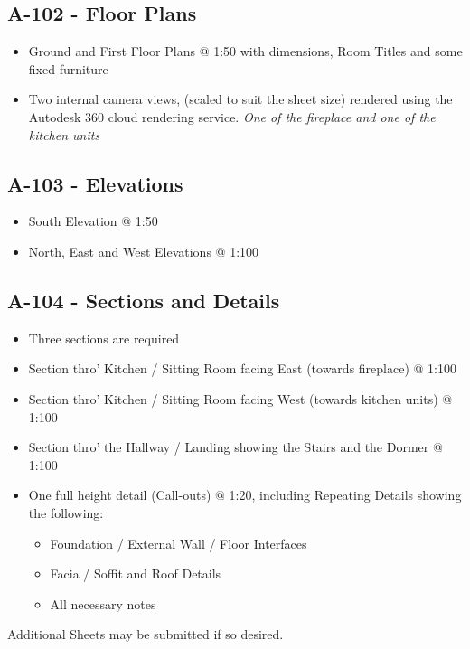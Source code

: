 \subsection*{A-102 - Floor Plans}
\begin{itemize}
	\item Ground and First Floor Plans @ 1:50 with dimensions, Room Titles and some fixed furniture
	\item Two internal camera views, (scaled to suit the sheet size) rendered using the Autodesk 360 cloud rendering service.  \textit{One of the fireplace and one of the kitchen units} 
\end{itemize}


\subsection*{A-103 - Elevations}
\begin{itemize}
	\item South Elevation @ 1:50
	\item North, East and West Elevations @ 1:100
\end{itemize}

\subsection*{A-104 - Sections and Details}
\begin{itemize}
	\item Three sections are required
	\item Section thro' Kitchen / Sitting Room facing East (towards fireplace) @ 1:100
	\item Section thro' Kitchen / Sitting Room facing West (towards kitchen units) @ 1:100
	\item Section thro' the Hallway / Landing showing the Stairs and the Dormer @ 1:100
	\item One full height detail (Call-outs) @ 1:20, including Repeating Details showing the following:
	\begin{itemize}
		\item Foundation / External Wall / Floor Interfaces
		\item Facia / Soffit and Roof Details
		\item All necessary notes
	\end{itemize} 
\end{itemize}

Additional Sheets may be submitted if so desired.


